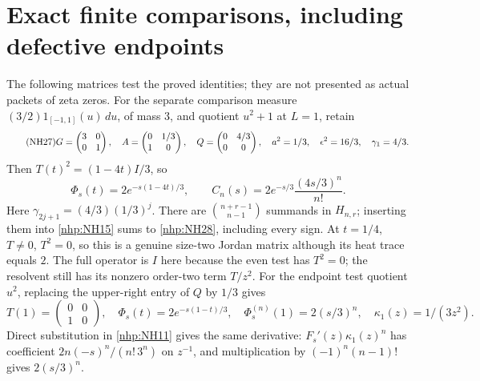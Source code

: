 \section{Exact finite comparisons, including defective endpoints}

The following matrices test the proved identities; they
are not presented as actual packets of zeta zeros.
For the separate comparison measure
\((3/2)1_{[-1,1]}(u)\,du\), of mass \(3\), and quotient
\(u^2+1\) at \(L=1\), retain
\begin{equation}\tag{NH27}\label{nhp:NH27}
G=\begin{pmatrix}3&0\\0&1\end{pmatrix},\quad
A=\begin{pmatrix}0&1/3\\1&0\end{pmatrix},\quad
Q=\begin{pmatrix}0&4/3\\0&0\end{pmatrix},\quad
a^2=1/3,\quad \epsilon^2=16/3,\quad \gamma_1=4/3 .
\end{equation}
Then \(T(t)^2=(1-4t)I/3\), so
\begin{equation}\tag{NH28}\label{nhp:NH28}
\Phi_s(t)=2e^{-s(1-4t)/3},\qquad
C_n(s)=2e^{-s/3}\frac{(4s/3)^n}{n!}.
\end{equation}
Here \(\gamma_{2j+1}=(4/3)(1/3)^j\).
There are \(\binom{n+r-1}{n-1}\) summands in \(H_{n,r}\);
inserting them into \eqref{nhp:NH15} sums to
\eqref{nhp:NH28}, including every sign.
At \(t=1/4\), \(T\ne0\), \(T^2=0\), so this is a
genuine size-two Jordan matrix although its heat trace
equals \(2\). The full operator is \(I\) here because
the even test has \(T^2=0\); the resolvent still has
its nonzero order-two term \(T/z^2\).
For the endpoint test quotient \(u^2\), replacing the
upper-right entry of \(Q\) by \(1/3\) gives
\begin{equation}\tag{NH29}\label{nhp:NH29}
T(1)=\begin{pmatrix}0&0\\1&0\end{pmatrix},\quad
\Phi_s(t)=2e^{-s(1-t)/3},\quad
\Phi_s^{(n)}(1)=2(s/3)^n,\quad
\kappa_1(z)=1/(3z^2).
\end{equation}
Direct substitution in \eqref{nhp:NH11} gives the same
derivative: \(F_s'(z)\kappa_1(z)^n\) has coefficient
\(2n(-s)^n/(n!\,3^n)\) on \(z^{-1}\), and multiplication
by \((-1)^n(n-1)!\) gives \(2(s/3)^n\).

